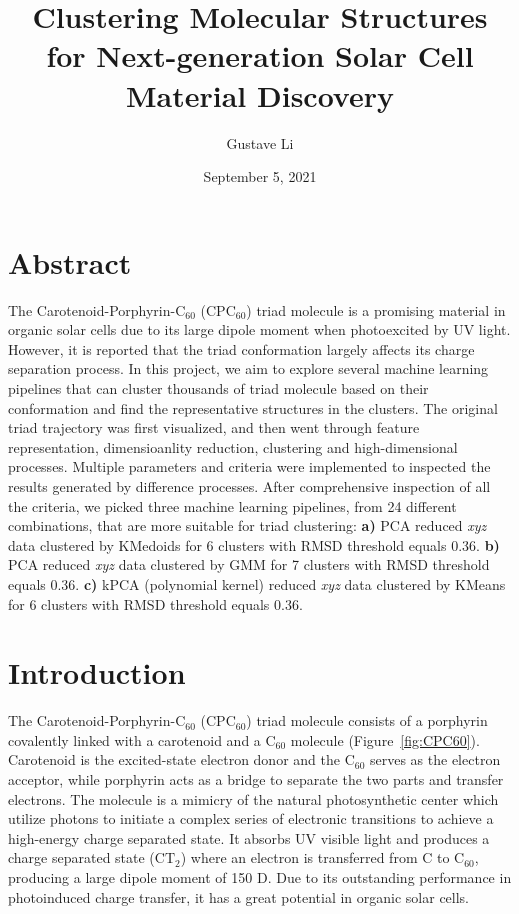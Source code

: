 \documentclass[a4paper]{article}
\title{Clustering Molecular Structures for Next-generation Solar Cell Material Discovery}
\author{Gustave Li}
\date{September 5, 2021}
\begin{document}
\maketitle

\section{Abstract}
The Carotenoid-Porphyrin-\(\text{C}_{60}\) (\(\text{CPC}_{60}\)) triad molecule is a promising material in organic solar cells due to its large dipole moment when photoexcited by UV light. However, it is reported that the triad conformation largely affects its charge separation process. In this project, we aim to explore several machine learning pipelines that can cluster thousands of triad molecule based on their conformation and find the representative structures in the clusters. The original triad trajectory was first visualized, and then went through feature representation, dimensioanlity reduction, clustering and high-dimensional processes. Multiple parameters and criteria were implemented to inspected the results generated by difference processes. After comprehensive inspection of all the criteria, we picked three machine learning pipelines, from 24 different combinations, that are more suitable for triad clustering: \textbf{a)} PCA reduced \textit{xyz} data clustered by KMedoids for 6 clusters with RMSD threshold equals 0.36. \textbf{b)} PCA reduced \textit{xyz} data clustered by GMM for 7 clusters with RMSD threshold equals 0.36. \textbf{c)} kPCA (polynomial kernel) reduced \textit{xyz} data clustered by KMeans for 6 clusters with RMSD threshold equals 0.36.

\section{Introduction}
The Carotenoid-Porphyrin-\(\text{C}_{60}\) (\(\text{CPC}_{60}\)) triad molecule consists of a porphyrin covalently linked with a carotenoid and a \(\text{C}_{60}\) molecule (Figure~\ref{fig:CPC60}). Carotenoid is the excited-state electron donor and the \(\text{C}_{60}\) serves as the electron acceptor, while porphyrin acts as a bridge to separate the two parts and transfer electrons. The molecule is a mimicry of the natural photosynthetic center which utilize photons to initiate a complex series of electronic transitions to achieve a high-energy charge separated state. It absorbs UV visible light and produces a charge separated state (\(\text{CT}_{2}\)) where an electron is transferred from C to \(\text{C}_{60}\), producing a large dipole moment of 150 D. Due to its outstanding performance in photoinduced charge transfer, it has a great potential in organic solar cells.
\end{document}
